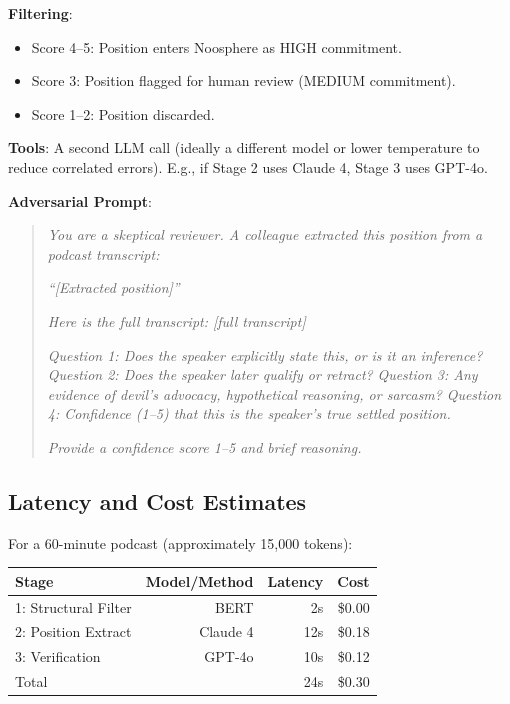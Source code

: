 \documentclass[11pt,letterpaper]{article}
\begin{document}
\textbf{Filtering}:
\begin{itemize}
  \item Score 4–5: Position enters Noosphere as HIGH commitment.
  \item Score 3: Position flagged for human review (MEDIUM commitment).
  \item Score 1–2: Position discarded.
\end{itemize}

\textbf{Tools}: A second LLM call (ideally a different model or lower temperature to reduce correlated errors). E.g., if Stage 2 uses Claude 4, Stage 3 uses GPT-4o.

\textbf{Adversarial Prompt}:

\begin{quote}
\textit{You are a skeptical reviewer. A colleague extracted this position from a podcast transcript:}

\textit{``[Extracted position]''}

\textit{Here is the full transcript: [full transcript]}

\textit{Question 1: Does the speaker explicitly state this, or is it an inference?}
\textit{Question 2: Does the speaker later qualify or retract?}
\textit{Question 3: Any evidence of devil's advocacy, hypothetical reasoning, or sarcasm?}
\textit{Question 4: Confidence (1–5) that this is the speaker's true settled position.}

\textit{Provide a confidence score 1–5 and brief reasoning.}
\end{quote}

\subsection{Latency and Cost Estimates}

For a 60-minute podcast (approximately 15,000 tokens):

\begin{center}
\begin{tabular}{lrrr}
  \toprule
  \textbf{Stage} & \textbf{Model/Method} & \textbf{Latency} & \textbf{Cost} \\
  \midrule
  1: Structural Filter & BERT & 2s & \$0.00 \\
  2: Position Extract & Claude 4 & 12s & \$0.18 \\
  3: Verification & GPT-4o & 10s & \$0.12 \\
  \midrule
  Total & & 24s & \$0.30 \\
  \bottomrule
\end{tabular}
\end{center}
\end{document}
